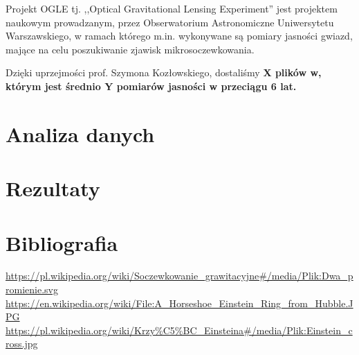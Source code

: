 \documentclass[a4paper,11pt]{article}
\newcommand{\ak}{\hspace{0.7 cm}}
\begin{document}
\ak Projekt OGLE  tj. ,,Optical Gravitational Lensing Experiment'' jest projektem naukowym prowadzanym, przez Obserwatorium Astronomiczne Uniwersytetu Warszawskiego, w ramach którego m.in. wykonywane są pomiary jasności gwiazd, mające na celu poszukiwanie zjawisk mikrosoczewkowania. 

\ak Dzięki uprzejmości prof. Szymona Kozłowskiego, dostaliśmy \bf{X} plików w, którym jest średnio \bf{Y} pomiarów jasności w przeciągu 6 lat. 
\section{Analiza danych}

\section{Rezultaty}

\section{Bibliografia}
\begin{thebibliography}{99}
 \url{https://pl.wikipedia.org/wiki/Soczewkowanie_grawitacyjne#/media/Plik:Dwa_promienie.svg}
 \url{https://en.wikipedia.org/wiki/File:A_Horseshoe_Einstein_Ring_from_Hubble.JPG}
 \url{https://pl.wikipedia.org/wiki/Krzy%C5%BC_Einsteina#/media/Plik:Einstein_cross.jpg}
\end{thebibliography}
\end{document}
